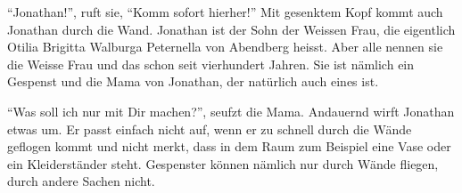 \enquote{Jonathan!}, ruft sie, \enquote{Komm sofort hierher!} Mit gesenktem Kopf kommt auch Jonathan durch die Wand. Jonathan ist der Sohn der Weissen Frau, die eigentlich Otilia Brigitta Walburga Peternella von Abendberg heisst. Aber alle nennen sie die Weisse Frau und das schon seit vierhundert Jahren. Sie ist nämlich ein Gespenst und die Mama von Jonathan, der natürlich auch eines ist. 

\enquote{Was soll ich nur mit Dir machen?}, seufzt die Mama. Andauernd wirft Jonathan etwas um. Er passt einfach nicht auf, wenn er zu schnell durch die Wände geflogen kommt und nicht merkt, dass in dem Raum zum Beispiel eine Vase oder ein Kleiderständer steht. Gespenster können nämlich nur durch Wände fliegen, durch andere Sachen nicht. 

